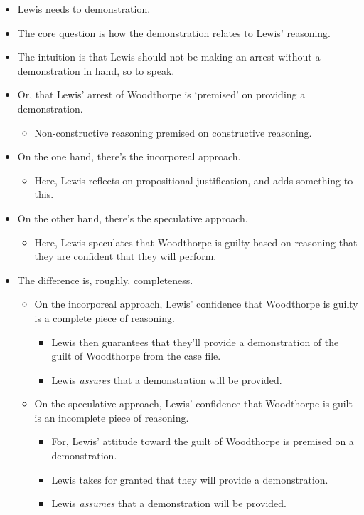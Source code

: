 \documentclass[10pt]{article}
\newcommand{\hozline}[0]{%
  \noindent\hdashrule[0.5ex][c]{\textwidth}{.1pt}{}
}
\begin{document}
\hozline

\begin{itemize}
\item Lewis needs to demonstration.
\item The core question is how the demonstration relates to Lewis' reasoning.
\item The intuition is that Lewis should not be making an arrest without a demonstration in hand, so to speak.
\item Or, that Lewis' arrest of Woodthorpe is `premised' on providing a demonstration.
  \begin{itemize}
  \item Non-constructive reasoning premised on constructive reasoning.
  \end{itemize}
\item On the one hand, there's the incorporeal approach.
  \begin{itemize}
  \item Here, Lewis reflects on propositional justification, and adds something to this.
  \end{itemize}
\item On the other hand, there's the speculative approach.
  \begin{itemize}
  \item Here, Lewis speculates that Woodthorpe is guilty based on reasoning that they are confident that they will perform.
  \end{itemize}
\item The difference is, roughly, completeness.
  \begin{itemize}
  \item On the incorporeal approach, Lewis' confidence that Woodthorpe is guilty is a complete piece of reasoning.
    \begin{itemize}
    \item Lewis then guarantees that they'll provide a demonstration of the guilt of Woodthorpe from the case file.
    \item Lewis \emph{assures} that a demonstration will be provided.
    \end{itemize}
  \item On the speculative approach, Lewis' confidence that Woodthorpe is guilt is an incomplete piece of reasoning.
    \begin{itemize}
    \item For, Lewis' attitude toward the guilt of Woodthorpe is premised on a demonstration.
    \item Lewis takes for granted that they will provide a demonstration.
    \item Lewis \emph{assumes} that a demonstration will be provided.
    \end{itemize}
  \end{itemize}
\end{itemize}
\end{document}
